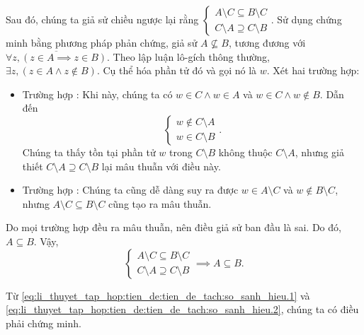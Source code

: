 Sau đó, chúng ta giả sử chiều ngược lại rằng $\begin{cases}
   A \setminus C \subseteq B \setminus C \\
   C \setminus A \supseteq C \setminus B
\end{cases}$. Sử dụng chứng minh bằng phương pháp phản chứng, giả sử $A \not \subseteq B$, tương đương với $\overline{\forall z, (z \in A \implies z \in B)}$. Theo lập luận lô-gích thông thường, $\exists z, (z \in A \land z \notin B)$. Cụ thể hóa phần tử đó và gọi nó là $w$. Xét hai trường hợp:
\begin{itemize}
   \item Trường hợp : Khi này, chúng ta có $w \in C \land w \in A$ và $w \in C \land w \notin B$. Dẫn đến
   \begin{equation*}
      \begin{cases}
         w \notin C \setminus A\\
         w \in C \setminus B
      \end{cases}.
   \end{equation*} Chúng ta thấy tồn tại phần tử $w$ trong $C \setminus B$ không thuộc $C \setminus A$, nhưng giả thiết $C \setminus A \supseteq C \setminus B$ lại mâu thuẫn với điều này.
   \item Trường hợp : Chúng ta cũng dễ dàng suy ra được $w \in A \setminus C$ và $w \notin B \setminus C$, nhưng $A \setminus C \subseteq B \setminus C$ cũng tạo ra mâu thuẫn.
\end{itemize}
Do mọi trường hợp đều ra mâu thuẫn, nên điều giả sử ban đầu là sai. Do đó, $A \subseteq B$. Vậy,
\begin{equation}
   \begin{cases}
      A \setminus C \subseteq B \setminus C \\
      C \setminus A \supseteq C \setminus B
   \end{cases} \implies A \subseteq B.
   \label{eq:li_thuyet_tap_hop:tien_de:tien_de_tach:so_sanh_hieu.2}
\end{equation}

Từ \eqref{eq:li_thuyet_tap_hop:tien_de:tien_de_tach:so_sanh_hieu.1} và \eqref{eq:li_thuyet_tap_hop:tien_de:tien_de_tach:so_sanh_hieu.2}, chúng ta có điều phải chứng minh.

